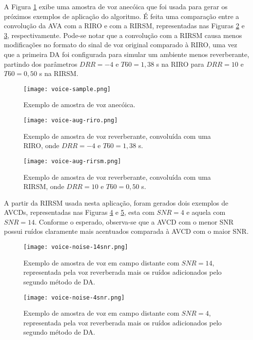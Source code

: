 A Figura \ref{fig:voice-sample} exibe uma amostra de voz anecóica que foi usada para gerar os próximos exemplos de aplicação
do algoritmo. É feita uma comparação entre a convolução da AVA com a RIRO e com a RIRSM, representadas nas Figuras \ref{fig:voice-aug-riro} e 
\ref{fig:voice-aug-rirsm}, respectivamente. Pode-se notar que a convolução com a RIRSM causa menos modificações no formato do sinal de voz original 
comparado à RIRO, uma vez que a primeira DA foi configurada para simular um ambiente menos reverberante, partindo dos parâmetros $DRR=-4$ e $T60=1,38$ s
na RIRO para $DRR=10$ e $T60=0,50$ s na RIRSM.

\begin{figure} [H]
    \centering
    \texttt{[image: voice-sample.png]}
    \caption{Exemplo de amostra de voz anecóica.}
    \label{fig:voice-sample}
\end{figure} 

\begin{figure} [H]
    \centering
    \texttt{[image: voice-aug-riro.png]}
    \caption{Exemplo de amostra de voz reverberante, convoluída com uma RIRO, onde $DRR = -4$ e $T60=1,38$ s.}
    \label{fig:voice-aug-riro}
\end{figure} 

\begin{figure} [H]
    \centering
    \texttt{[image: voice-aug-rirsm.png]}
    \caption{Exemplo de amostra de voz reverberante, convoluída com uma RIRSM, onde $DRR = 10$ e $T60=0,50$ s.}
    \label{fig:voice-aug-rirsm}
\end{figure} 

A partir da RIRSM usada nesta aplicação, foram gerados dois exemplos de AVCDs, representadas nas Figuras \ref{fig:voice-noise-14snr} e 
\ref{fig:voice-noise-4snr}, esta com $SNR = 4$ e aquela com $SNR = 14$. Conforme o esperado, observa-se que a AVCD com o menor SNR
possui ruídos claramente mais acentuados comparada à AVCD com o maior SNR.

\begin{figure} [H]
    \centering
    \texttt{[image: voice-noise-14snr.png]}
    \caption{Exemplo de amostra de voz em campo distante com $SNR = 14$, representada pela voz reverberada mais os ruídos adicionados pelo segundo método de DA.}
    \label{fig:voice-noise-14snr}
\end{figure} 

\begin{figure} [H]
    \centering
    \texttt{[image: voice-noise-4snr.png]}
    \caption{Exemplo de amostra de voz em campo distante com $SNR = 4$, representada pela voz reverberada mais os ruídos adicionados pelo segundo método de DA.}
    \label{fig:voice-noise-4snr}
\end{figure} 